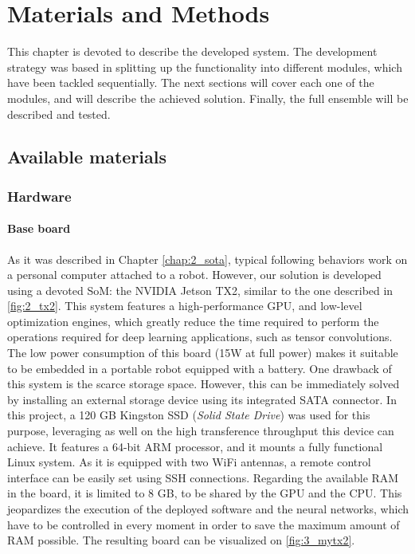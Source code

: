 \chapter{Materials and Methods}
\label{chap:3_materials_methods}
This chapter is devoted to describe the developed system. The development strategy was based in splitting up the functionality into different modules, which have been tackled sequentially. The next sections will cover each one of the modules, and will describe the achieved solution. Finally, the full ensemble will be described and tested.



\section{Available materials}
\label{sec:3_materials}
\subsection{Hardware}
\label{sec:3_hw}
\subsubsection{Base board}
As it was described in Chapter \ref{chap:2_sota}, typical following behaviors work on a personal computer attached to a robot. However, our solution is developed using a devoted SoM: the NVIDIA Jetson TX2, similar to the one described in \autoref{fig:2_tx2}. This system features a high-performance GPU, and low-level optimization engines, which greatly reduce the time required to perform the operations required for deep learning applications, such as tensor convolutions. The low power consumption of this board (15W at full power) makes it suitable to be embedded in a portable robot equipped with a battery. One drawback of this system is the scarce storage space. However, this can be immediately solved by installing an external storage device using its integrated SATA connector. In this project, a 120 GB Kingston SSD (\textit{Solid State Drive}) was used for this purpose, leveraging as well on the high transference throughput this device can achieve. It features a 64-bit ARM processor, and it mounts a fully functional Linux system. As it is equipped with two WiFi antennas, a remote control interface can be easily set using SSH connections. Regarding the available RAM in the board, it is limited to 8 GB, to be shared by the GPU and the CPU. This jeopardizes the execution of the deployed software and the neural networks, which have to be controlled in every moment in order to save the maximum amount of RAM possible. The resulting board can be visualized on \autoref{fig:3_mytx2}.\\

